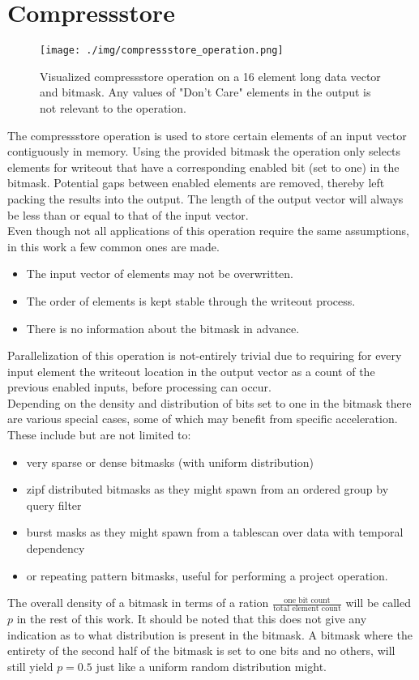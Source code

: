 \documentclass{tudscrreprt}
\begin{document}
		\section{Compressstore}
			\begin{figure}[!ht]
				\centering
				\texttt{[image: ./img/compressstore\_operation.png]}
				\caption{\label{fig:compressstore_operation}Visualized compressstore operation on a 16 element long data vector and bitmask. Any values of "Don't Care" elements in the output is not relevant to the operation.}
			\end{figure}
			The compressstore operation is used to store certain elements of an input vector contiguously in memory. Using the provided bitmask the operation only selects elements for writeout that have a corresponding enabled bit (set to one) in the bitmask. Potential gaps between enabled elements are removed, thereby left packing the results into the output. The length of the output vector will always be less than or equal to that of the input vector. \\
			Even though not all applications of this operation require the same assumptions, in this work a few common ones are made.
			\begin{itemize}
				\item The input vector of elements may not be overwritten.
				\item The order of elements is kept stable through the writeout process.
				\item There is no information about the bitmask in advance.
			\end{itemize}
			Parallelization of this operation is not-entirely trivial due to requiring for every input element the writeout location in the output vector as a count of the previous enabled inputs, before processing can occur. \\
			Depending on the density and distribution of bits set to one in the bitmask there are various special cases, some of which may benefit from specific acceleration. \\
			These include but are not limited to:
			\begin{itemize}
				\item very sparse or dense bitmasks (with uniform distribution)
				\item zipf distributed bitmasks as they might spawn from an ordered group by query filter
				\item burst masks as they might spawn from a tablescan over data with temporal dependency
				\item or repeating pattern bitmasks, useful for performing a project operation.
			\end{itemize}
			The overall density of a bitmask in terms of a ration $\frac{\text{one bit count}}{\text{total element count}}$ will be called $p$ in the rest of this work. It should be noted that this does not give any indication as to what distribution is present in the bitmask. A bitmask where the entirety of the second half of the bitmask is set to one bits and no others, will still yield $p=0.5$ just like a uniform random distribution might. \\
		
\end{document}
